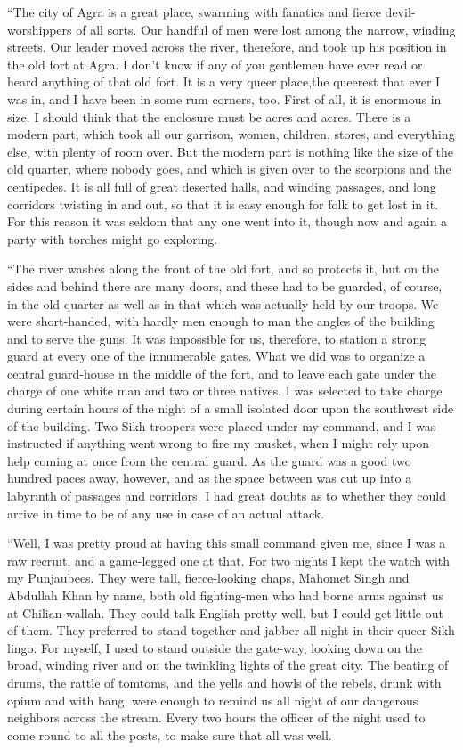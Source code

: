 \documentclass[12pt,english,oneside]{book}
\begin{document}
{}``The city of Agra is a great place, swarming with fanatics and
fierce devil-worshippers of all sorts. Our handful of men were lost
among the narrow, winding streets. Our leader moved across the river,
therefore, and took up his position in the old fort at Agra. I don't
know if any of you gentlemen have ever read or heard anything of that
old fort. It is a very queer place,\mdsh{---}the queerest that ever
I was in, and I have been in some rum corners, too. First of all,
it is enormous in size. I should think that the enclosure must be
acres and acres. There is a modern part, which took all our garrison,
women, children, stores, and everything else, with plenty of room
over. But the modern part is nothing like the size of the old quarter,
where nobody goes, and which is given over to the scorpions and the
centipedes. It is all full of great deserted halls, and winding passages,
and long corridors twisting in and out, so that it is easy enough
for folk to get lost in it. For this reason it was seldom that any
one went into it, though now and again a party with torches might
go exploring.

{}``The river washes along the front of the old fort, and so protects
it, but on the sides and behind there are many doors, and these had
to be guarded, of course, in the old quarter as well as in that which
was actually held by our troops. We were short-handed, with hardly
men enough to man the angles of the building and to serve the guns.
It was impossible for us, therefore, to station a strong guard at
every one of the innumerable gates. What we did was to organize a
central guard-house in the middle of the fort, and to leave each gate
under the charge of one white man and two or three natives. I was
selected to take charge during certain hours of the night of a small
isolated door upon the southwest side of the building. Two Sikh troopers
were placed under my command, and I was instructed if anything went
wrong to fire my musket, when I might rely upon help coming at once
from the central guard. As the guard was a good two hundred paces
away, however, and as the space between was cut up into a labyrinth
of passages and corridors, I had great doubts as to whether they could
arrive in time to be of any use in case of an actual attack.

{}``Well, I was pretty proud at having this small command given me,
since I was a raw recruit, and a game-legged one at that. For two
nights I kept the watch with my Punjaubees. They were tall, fierce-looking
chaps, Mahomet Singh and Abdullah Khan by name, both old fighting-men
who had borne arms against us at Chilian-wallah. They could talk English
pretty well, but I could get little out of them. They preferred to
stand together and jabber all night in their queer Sikh lingo. For
myself, I used to stand outside the gate-way, looking down on the
broad, winding river and on the twinkling lights of the great city.
The beating of drums, the rattle of tomtoms, and the yells and howls
of the rebels, drunk with opium and with bang, were enough to remind
us all night of our dangerous neighbors across the stream. Every two
hours the officer of the night used to come round to all the posts,
to make sure that all was well.
\end{document}
